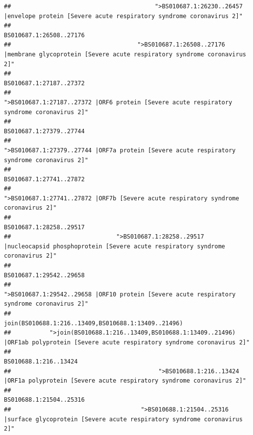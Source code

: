 \documentclass[
]{article}
\begin{document}
\begin{verbatim}
##                                         ">BS010687.1:26230..26457 |envelope protein [Severe acute respiratory syndrome coronavirus 2]" 
##                                                                                                                BS010687.1:26508..27176 
##                                    ">BS010687.1:26508..27176 |membrane glycoprotein [Severe acute respiratory syndrome coronavirus 2]" 
##                                                                                                                BS010687.1:27187..27372 
##                                             ">BS010687.1:27187..27372 |ORF6 protein [Severe acute respiratory syndrome coronavirus 2]" 
##                                                                                                                BS010687.1:27379..27744 
##                                            ">BS010687.1:27379..27744 |ORF7a protein [Severe acute respiratory syndrome coronavirus 2]" 
##                                                                                                                BS010687.1:27741..27872 
##                                                    ">BS010687.1:27741..27872 |ORF7b [Severe acute respiratory syndrome coronavirus 2]" 
##                                                                                                                BS010687.1:28258..29517 
##                              ">BS010687.1:28258..29517 |nucleocapsid phosphoprotein [Severe acute respiratory syndrome coronavirus 2]" 
##                                                                                                                BS010687.1:29542..29658 
##                                            ">BS010687.1:29542..29658 |ORF10 protein [Severe acute respiratory syndrome coronavirus 2]" 
##                                                                                    join(BS010688.1:216..13409,BS010688.1:13409..21496) 
##           ">join(BS010688.1:216..13409,BS010688.1:13409..21496) |ORF1ab polyprotein [Severe acute respiratory syndrome coronavirus 2]" 
##                                                                                                                  BS010688.1:216..13424 
##                                          ">BS010688.1:216..13424 |ORF1a polyprotein [Severe acute respiratory syndrome coronavirus 2]" 
##                                                                                                                BS010688.1:21504..25316 
##                                     ">BS010688.1:21504..25316 |surface glycoprotein [Severe acute respiratory syndrome coronavirus 2]" 

\end{verbatim}
\end{document}
